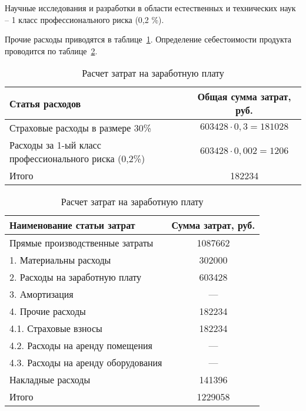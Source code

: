Научные исследования и разработки в области естественных и
технических наук – 1 класс профессионального риска (0,2 \%).

Прочие расходы приводятся в таблице~\ref{tab:other-expenses}.
Определение себестоимости продукта проводится по таблице~\ref{tab:cost-price}.

\begin{table}
	\caption{Расчет затрат на заработную плату}\label{tab:other-expenses}
	\begin{tabularx}{\textwidth}{|X|c|}
		\hline Статья расходов                                       & Общая сумма затрат, руб.    \\
		\hline Страховые расходы в размере 30\%                      & $603428 \cdot 0,3 = 181028$ \\
		\hline Расходы за 1-ый класс профессионального риска (0,2\%) & $603428 \cdot 0,002 = 1206$ \\
		\hline Итого                                                 & 182234                      \\
		\hline
	\end{tabularx}
\end{table}

\begin{table}
	\caption{Расчет затрат на заработную плату}\label{tab:cost-price}
	\begin{tabularx}{\textwidth}{|X|c|}
		\hline Наименование статьи затрат          & Сумма затрат, руб. \\
		\hline Прямые производственные затраты     & 1087662            \\
		\hline 1. Материальны расходы              & 302000             \\
		\hline 2. Расходы на заработную плату      & 603428             \\
		\hline 3. Амортизация                      & —                  \\
		\hline 4. Прочие расходы                   & 182234             \\
		\hline 4.1. Страховые взносы               & 182234             \\
		\hline 4.2. Расходы на аренду помещения    & —                  \\
		\hline 4.3. Расходы на аренду оборудования & —                  \\
		\hline Накладные расходы                   & 141396             \\
		\hline Итого                               & 1229058            \\
		\hline
	\end{tabularx}
\end{table}

